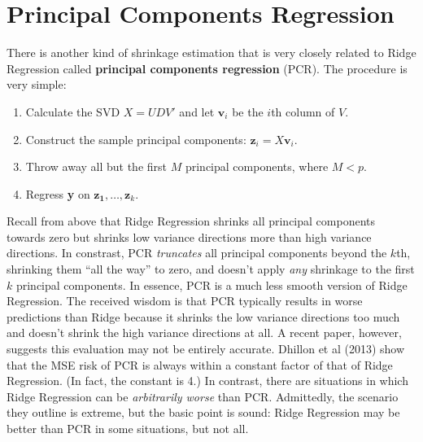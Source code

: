 \section{Principal Components Regression}
There is another kind of shrinkage estimation that is very closely related to Ridge Regression called \textbf{principal components regression} (PCR). The procedure is very simple:
	\begin{enumerate}
		\item Calculate the SVD $X=UDV'$ and let $\mathbf{v}_i$ be the $i$th column of $V$.
		\item Construct the sample principal components: $\mathbf{z}_i = X \mathbf{v}_i$.
		\item Throw away all but the first $M$ principal components, where $M <p$.
		\item Regress \textbf{y} on $\mathbf{z_1}, \hdots, \mathbf{z}_k$. 
	\end{enumerate}
Recall from above that Ridge Regression shrinks all principal components towards zero but shrinks low variance directions more than high variance directions. In constrast, PCR \emph{truncates} all principal components beyond the $k$th, shrinking them ``all the way'' to zero, and doesn't apply \emph{any} shrinkage to the first $k$ principal components. In essence, PCR is a much less smooth version of Ridge Regression. The received wisdom is that PCR typically results in worse predictions than Ridge because it shrinks the low variance directions too much and doesn't shrink the high variance directions at all. A recent paper, however, suggests this evaluation may not be entirely accurate. Dhillon et al (2013) show that the MSE risk of PCR is always within a constant factor of that of Ridge Regression. (In fact, the constant is 4.) In contrast, there are situations in which Ridge Regression can be \emph{arbitrarily worse} than PCR. Admittedly, the scenario they outline is extreme, but the basic point is sound: Ridge Regression may be better than PCR in some situations, but not all. 


